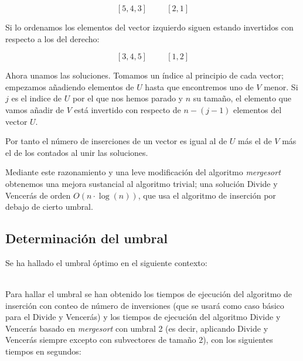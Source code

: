 \[[5,4,3] \hspace{1cm} [2,1]\]

Si lo ordenamos los elementos del vector izquierdo siguen estando invertidos con respecto a los del derecho:

\[[3,4,5] \hspace{1cm} [1,2]\]

Ahora unamos las soluciones. Tomamos un índice al principio de cada vector; empezamos añadiendo elementos de $U$ hasta que encontremos uno de $V$ menor. Si $j$ es el indice de $U$ por el que nos hemos parado y $n$ su tamaño, el elemento que vamos añadir de $V$ está invertido con respecto de $n-(j-1)$ elementos del vector $U$.

Por tanto el número de inserciones de un vector es igual al de $U$ más el de $V$ más el de los contados al unir las soluciones.

Mediante este razonamiento y una leve modificación del algoritmo \textit{mergesort} obtenemos una mejora sustancial al algoritmo trivial; una solución Divide y Vencerás de orden $O(n\cdot \log(n))$, que usa el algoritmo de inserción por debajo de cierto umbral.

\subsection{Determinación del umbral}

Se ha hallado el umbral óptimo en el siguiente contexto:

 \\


Para hallar el umbral se han obtenido los tiempos de ejecución del algoritmo de inserción con conteo de número de inversiones (que se usará como caso básico para el Divide y Vencerás) y los tiempos de ejecución del algoritmo Divide y Vencerás basado en \textit{mergesort} con umbral 2 (es decir, aplicando Divide y Vencerás siempre excepto con subvectores de tamaño 2), con los siguientes tiempos en segundos:


\vspace*{1cm}

\prefIns
{}\prefDVt
{} {\prefIns}

\pgfplotstabletypeset[
display columns/0/.style={column name=Tamaño},
display columns/1/.style={column name=Inserción},
display columns/2/.style={column name=Mergesort},
]{\prefIns}


